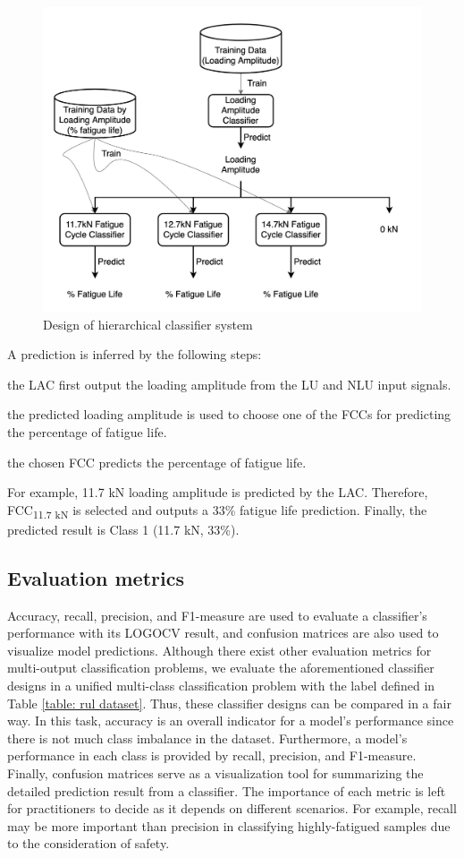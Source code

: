 \begin{figure}[tb]
    \centering
    \includegraphics[width=0.9\linewidth]{fig/hierarchical_classifier.png}
    \caption{Design of hierarchical classifier system}
    \label{fig: hierarchical classifier}
\end{figure}


A prediction is inferred by the following steps: 
\begin{enumerate*}[label=(\alph*)]
    \item the LAC first output the loading amplitude from the LU and NLU input signals.
    \item the predicted loading amplitude is used to choose one of the FCCs for predicting the percentage of fatigue life.
    \item the chosen FCC predicts the percentage of fatigue life.
\end{enumerate*}
For example, 11.7 kN loading amplitude is predicted by the LAC. Therefore, FCC\textsubscript{11.7 kN} is selected and outputs a 33\% fatigue life prediction. Finally, the predicted result is Class 1 (11.7 kN, 33\%).

\subsection{Evaluation metrics}
Accuracy, recall, precision, and F1-measure are used to evaluate a classifier's performance with its LOGOCV result, and confusion matrices are also used to visualize model predictions. Although there exist other evaluation metrics for multi-output classification problems, we evaluate the aforementioned classifier designs in a unified multi-class classification problem with the label defined in Table \ref{table: rul dataset}. Thus, these classifier designs can be compared in a fair way. In this task, accuracy is an overall indicator for a model's performance since there is not much class imbalance in the dataset. Furthermore, a model's performance in each class is provided by recall, precision, and F1-measure. Finally, confusion matrices serve as a visualization tool for summarizing the detailed prediction result from a classifier. The importance of each metric is left for practitioners to decide as it depends on different scenarios. For example, recall may be more important than precision in classifying highly-fatigued samples due to the consideration of safety.

